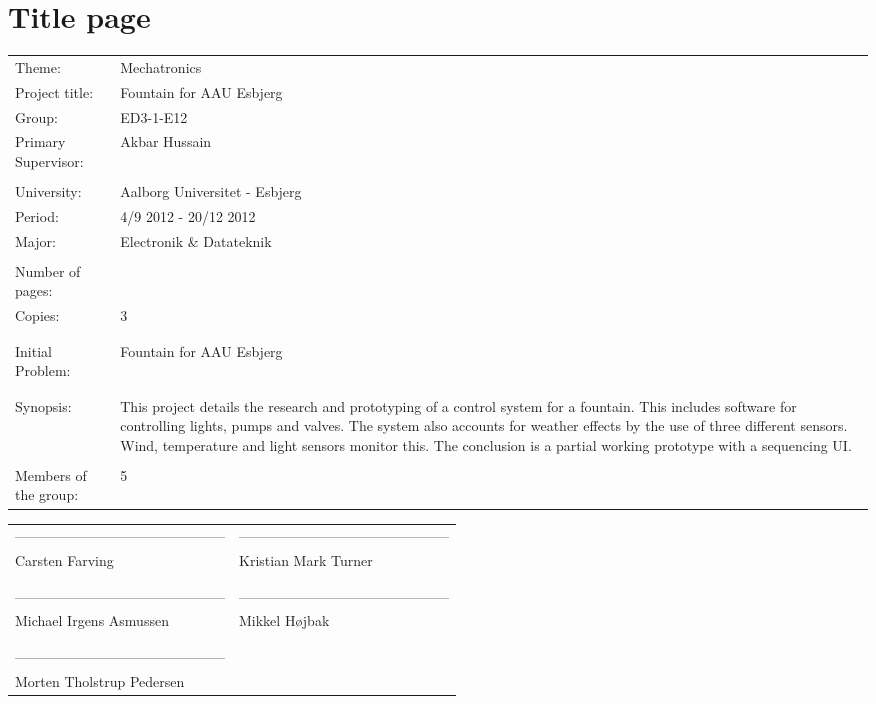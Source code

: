 \section*{Title page}
\setcounter{page}{1}
\begin{tabularx}{\hsize}{lX}
	Theme: & Mechatronics \\
	Project title: & Fountain for AAU Esbjerg \\
	Group: & ED3-1-E12 \\
	Primary Supervisor: & Akbar Hussain \\\\
	University: & Aalborg Universitet - Esbjerg\\
	Period: & 4/9 2012 - 20/12 2012 \\
	Major: & Electronik \& Datateknik \\\\
	Number of pages: & \pageref{LastPage} \\ 
	Copies: & 3\\\\\\
	Initial Problem: & Fountain for AAU Esbjerg\\
	& \\\cline{2-2}\\
	Synopsis: & This project details the research and prototyping of a control system for a fountain. This includes software for controlling lights, pumps and valves. The system also accounts for weather effects by the use of three different sensors. Wind, temperature and light sensors monitor this. The conclusion is a partial working prototype with a sequencing UI.  \\\\
	Members of the group: & 5 \\
\end{tabularx}


\vspace{1.5cm}
\noindent\begin{tabularx}{\hsize}{XX}
--------------------------------------------- & --------------------------------------------- \\
Carsten Farving & Kristian Mark Turner \\\\\\
--------------------------------------------- & --------------------------------------------- \\
Michael Irgens Asmussen & Mikkel H{\o}jbak \\\\\\
--------------------------------------------- \\
Morten Tholstrup Pedersen \\
\end{tabularx}

\newpage
